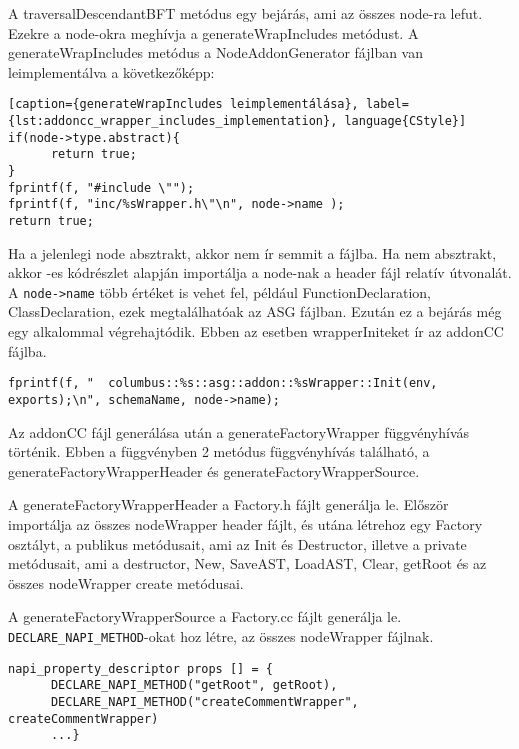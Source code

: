 A traversalDescendantBFT metódus egy bejárás, ami az összes node-ra lefut. Ezekre a node-okra meghívja a generateWrapIncludes metódust.
A generateWrapIncludes metódus a NodeAddonGenerator fájlban van leimplementálva a következőképp:

\begin{lstlisting}[caption={generateWrapIncludes leimplementálása}, label={lst:addoncc_wrapper_includes_implementation}, language{CStyle}]
if(node->type.abstract){
      return true;
}
fprintf(f, "#include \"");
fprintf(f, "inc/%sWrapper.h\"\n", node->name );
return true;
\end{lstlisting}

Ha a jelenlegi node absztrakt, akkor nem ír semmit a fájlba.
Ha nem absztrakt, akkor -es kódrészlet alapján importálja a node-nak a header fájl relatív útvonalát.
A \texttt{node->name} több értéket is vehet fel, például FunctionDeclaration, ClassDeclaration, ezek megtalálhatóak az ASG fájlban.
Ezután ez a bejárás még egy alkalommal végrehajtódik. Ebben az esetben wrapperIniteket ír az addonCC fájlba.

\begin{lstlisting}[caption={generateWrapInit leimplementálása}, label={lst:addoncc_wrapper_inits_implementation}, language={CStyle}]
fprintf(f, "  columbus::%s::asg::addon::%sWrapper::Init(env, exports);\n", schemaName, node->name);
\end{lstlisting}


Az addonCC fájl generálása után a generateFactoryWrapper függvényhívás történik.
Ebben a függvényben 2 metódus függvényhívás található, a generateFactoryWrapperHeader és generateFactoryWrapperSource.


A generateFactoryWrapperHeader a Factory.h fájlt generálja le.
Először importálja az összes nodeWrapper header fájlt, és utána létrehoz egy Factory osztályt, a publikus metódusait, ami az Init és Destructor, illetve a private metódusait,
ami a destructor, New, SaveAST, LoadAST, Clear, getRoot és az összes nodeWrapper create metódusai.


A generateFactoryWrapperSource a Factory.cc fájlt generálja le.
\texttt{DECLARE\_NAPI\_METHOD}-okat hoz létre, az összes nodeWrapper fájlnak.

\begin{lstlisting}[caption={Factory.cc fájl}, label={lst:factory_cc}, language={CStyle}]
napi_property_descriptor props [] = {
      DECLARE_NAPI_METHOD("getRoot", getRoot),
      DECLARE_NAPI_METHOD("createCommentWrapper", createCommentWrapper)
      ...}
\end{lstlisting}


